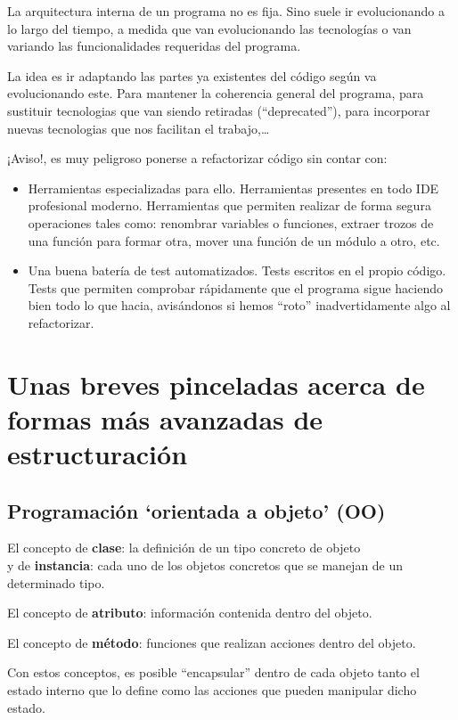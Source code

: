 \documentclass[spanish,12pt,a4paper,final,oneside]{book}
\begin{document}
La arquitectura interna de un programa no es fija. Sino suele ir evolucionando a lo largo del tiempo, a medida que van evolucionando las tecnologías o van variando las funcionalidades requeridas del programa.

La idea es ir adaptando las partes ya existentes del código según va evolucionando este. Para mantener la coherencia general del programa, para sustituir tecnologias que van siendo retiradas (``deprecated''), para incorporar nuevas tecnologias que nos facilitan el trabajo,\ldots

\vspace{1cm}
¡Aviso!, es muy peligroso ponerse a refactorizar código sin contar con:
\begin{itemize}
\item Herramientas especializadas para ello. Herramientas presentes en todo IDE profesional moderno. Herramientas que permiten realizar de forma segura operaciones tales como: renombrar variables o funciones, extraer trozos de una función para formar otra, mover una función de un módulo a otro, etc.
\item Una buena batería de test automatizados. Tests escritos en el propio código. Tests que permiten comprobar rápidamente que el programa sigue haciendo bien todo lo que hacia, avisándonos si hemos ``roto'' inadvertidamente algo al refactorizar.
\end{itemize}


\section{Unas breves pinceladas acerca de formas más avanzadas de estructuración}

\subsection{Programación `orientada a objeto' (OO)}
El concepto de \textbf{clase}: la definición de un tipo concreto de objeto
\\ y de \textbf{instancia}: cada uno de los objetos concretos que se manejan de un determinado tipo.

El concepto de \textbf{atributo}: información contenida dentro del objeto.

El concepto de \textbf{método}: funciones que realizan acciones dentro del objeto.

Con estos conceptos, es posible ``encapsular'' dentro de cada objeto tanto el estado interno que lo define como las acciones que pueden manipular dicho estado.
\end{document}
